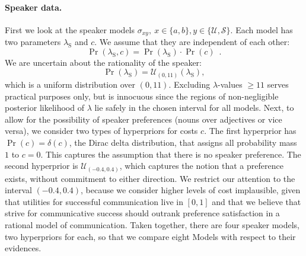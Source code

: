 \paragraph{Speaker data.} First we look at the speaker models $\sigma_{xy},\
x\in\{a,b\},y\in\{\mathcal{U},\mathcal{S}\}$. Each model has two
parameters $\lambda_\mathrm{S}$ and $c$. We assume that they are
independent of each other:
\begin{equation}\label{hyper-speaker-independent}
\Pr(\lambda_\mathrm{S},c)=\Pr(\lambda_\mathrm{S}) \cdot \Pr(c) \enspace .
\end{equation}
We are uncertain about the rationality of the speaker:
\begin{equation}\label{hyper-speaker-lambda}
\Pr(\lambda_\mathrm{S})= \mathcal{U}_{(0,11)}(\lambda_\mathrm{S}),
\end{equation}
which is a uniform distribution over $(0,11)$. Excluding
$\lambda$-values $\ge 11$ serves practical purposes only, but is
innocuous since the regions of non-negligible posterior likelihood of
$\lambda$ lie safely in the chosen interval for all models. Next, to
allow for the possibility of speaker preferences (nouns over
adjectives or vice versa), we consider two types of hyperpriors for
costs $c$. The first hyperprior has $\Pr(c)= \delta(c)$, the Dirac
delta distribution, that assigns all probability mass $1$ to
$c=0$. This captures the assumption that there is no speaker
preference. The second hyperprior is $\mathcal{U}_{(-0.4,0.4)}$, which
captures the notion that a preference exists, without commitment to
either direction. We restrict our attention to the interval
$(-0.4,0.4)$, because we consider higher levels of cost implausible,
given that utilities for successful communication live in $[0,1]$ and
that we believe that strive for communicative success should outrank
preference satisfaction in a rational model of communication. Taken
together, there are four speaker models, two hyperpriors for each, so
that we compare eight Models with respect to their evidences.

